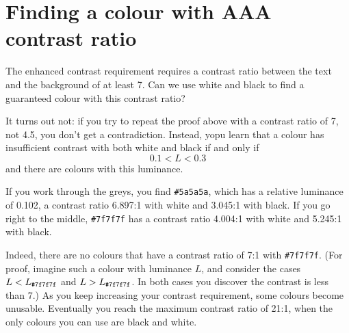 \documentclass[12pt]{article}
\begin{document}

  \section*{Finding a colour with AAA contrast ratio} %
  \label{sec:finding_a_colour_with_aaa_contrast_ratio}

  The enhanced contrast requirement requires a contrast ratio between the text and the background of at least 7.
  Can we use white and black to find a guaranteed colour with this contrast ratio?

  It turns out not: if you try to repeat the proof above with a contrast ratio of 7, not 4.5, you don't get a contradiction.
  Instead, yopu learn that a colour has insufficient contrast with both white and black if and only if
  \begin{equation*}
    0.1 < L < 0.3
  \end{equation*}
  and there are colours with this luminance.

  If you work through the greys, you find \texttt{\#5a5a5a}, which has a relative luminance of 0.102, a contrast ratio 6.897:1 with white and 3.045:1 with black.
  If you go right to the middle, \texttt{\#7f7f7f} has a contrast ratio 4.004:1 with white and 5.245:1 with black.

  Indeed, there are no colours that have a contrast ratio of 7:1 with \texttt{\#7f7f7f}.
  (For proof, imagine such a colour with luminance $L$, and consider the cases $L<L_\text{\texttt{\#7f7f7f}}$ and $L>L_\text{\texttt{\#7f7f7f}}$.
  In both cases you discover the contrast is less than 7.)
  As you keep increasing your contrast requirement, some colours become unusable.
  Eventually you reach the maximum contrast ratio of 21:1, when the only colours you can use are black and white.

\end{document}

